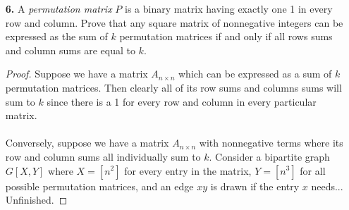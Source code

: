 \documentclass[ 12pt ]{article}
\begin{document}
\begin{enumerate}
\begin{proof}
\begin{enumerate}
					\item[\textbf{iii.}] Observe that $K_4$ can be illustrated as [insert photo]. Therefore, $K_4$ is planar by definition. In regard to outerplanarity, suppose by
						contradiction that $K_4$ is outerplanar. Then it must hold that $e(K_4) \leq 2n - 3$ via \textbf{ii}; however, $$e(K_4) = 6 \geq 5 = 2n - 3.$$

					\item[\textbf{iv.}] [Missing proof].
				\end{enumerate}
			\end{proof}


		\item[\textbf{6.}] A \textit{permutation matrix} $P$ is a binary matrix having exactly one 1 in every row and column. Prove that any square matrix of nonnegative integers can be
			expressed as the sum of $k$ permutation matrices if and only if all rows sums and column sums are equal to $k$.

			\begin{proof}
				Suppose we have a matrix $A_{n \times n}$ which can be expressed as a sum of $k$ permutation matrices. Then clearly all of its row sums and columns sums will sum to $k$
				since there is a 1 for every row and column in every particular matrix. \\ \\
				Conversely, suppose we have a matrix $A_{n \times n}$ with nonnegative terms where its row and column sums all individually sum to $k$. Consider a bipartite graph
				$G[X, Y]$ where $X = [n^2]$ for every entry in the matrix, $Y = [n^3]$ for all possible permutation matrices, and an edge $xy$ is drawn if the entry $x$ needs... \\
				Unfinished.
			\end{proof}
\end{enumerate}
\end{document}
